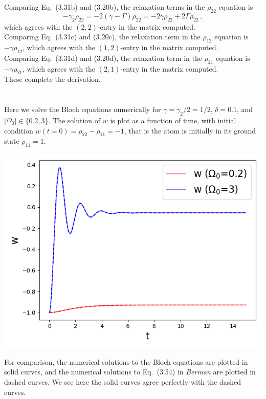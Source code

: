 \documentclass[11pt, oneside]{book}
\theoremstyle{break}
\theoremstyle{break}
\begin{document}
Comparing Eq.\ (3.31b) and (3.20b), the relaxation terms in the $\dot{\rho}_{22}$ equation is $$-\gamma_2 \rho_{22} = -2(\gamma-\Gamma)\rho_{22} = -2\gamma \rho_{22}+2\Gamma\rho_{22} \,,$$ which agrees with the $(2,2)$-entry in the matrix computed. \\

Comparing Eq.\ (3.31c) and (3.20c), the relaxation term in the $\dot{\rho}_{12}$ equation is $-\gamma \rho_{12}$, which agrees with the $(1,2)$-entry in the matrix computed. \\

Comparing Eq.\ (3.31d) and (3.20d), the relaxation term in the $\dot{\rho}_{21}$ equation is $-\gamma \rho_{21}$, which agrees with the $(2,1)$-entry in the matrix computed. \\

These complete the derivation. 


\chapter{}
Here we solve the Bloch equations numerically for $\gamma = \gamma_2/2 = 1/2$, $\delta = 0.1$, and $|\Omega_0| \in \{0.2, 3\}$. The solution of $w$ is plot as a function of time, with initial condition $w(t=0) =\rho_{22}-\rho_{11} =-1$, that is the atom is initially in its ground state $\rho_{11} = 1$. 

\begin{center}
\includegraphics[scale=0.6]{542HW3/fig}
\end{center}

For comparison, the numerical solutions to the Bloch equations are plotted in solid curves, and the numerical solutions to Eq.\ (3.54) in \textit{Berman} are plotted in dashed curves. We see here the solid curves agree perfectly with the dashed curves. \\
\end{document}
